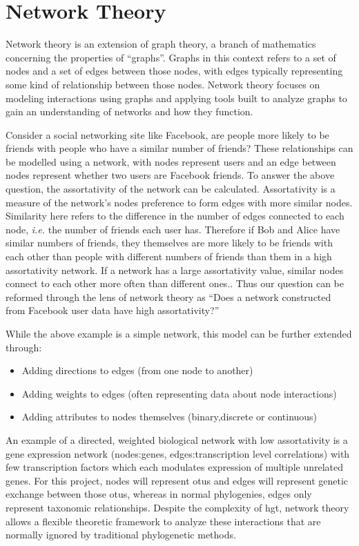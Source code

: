 \section*{Network Theory}
Network theory is an extension of graph theory, a branch of mathematics concerning the properties of ``graphs''.
Graphs in this context refers to a set of nodes and a set of edges between those nodes, with edges typically representing some kind of relationship between those nodes\citep{netgen}.
Network theory focuses on modeling interactions using graphs and applying tools built to analyze graphs to gain an understanding of networks and how they function.\par
Consider a social networking site like Facebook, are people more likely to be friends with people who have a similar number of friends?
These relationships can be modelled using a network, with nodes represent users and an edge between nodes represent whether two users are Facebook friends.
To answer the above question, the assortativity of the network can be calculated.
Assortativity is a measure of the network's nodes preference to form edges with more similar nodes\citep{netgen}.
Similarity here refers to the difference in the number of edges connected to each node, \textit{i.e.} the number of friends each user has.
Therefore if Bob and Alice have similar numbers of friends, they themselves are more likely to be friends with each other than people with different numbers of friends than them in a high assortativity network.
If a network has a large assortativity value, similar nodes connect to each other more often than different ones.\citep{netgen}.
Thus our question can be reformed through the lens of network theory as ``Does a network constructed from Facebook user data have high assortativity?''
\begin{center}
\end{center}
While the above example is a simple network, this model can be further extended through:
\begin{itemize}
    \item Adding directions to edges (from one node to another)
    \item Adding weights to edges (often representing data about node interactions)
    \item Adding attributes to nodes themselves (binary,discrete or continuous)
\end{itemize}
An example of a directed, weighted biological network with low assortativity is a gene expression network (nodes:genes, edges:transcription level correlations) with few transcription factors which each modulates expression of multiple unrelated genes.
For this project, nodes will represent \ac{otu}s and edges will represent genetic exchange between those \ac{otu}s, whereas in normal phylogenies, edges only represent taxonomic relationships.
Despite the complexity of \ac{hgt}, network theory allows a flexible theoretic framework to analyze these interactions that are normally ignored by traditional phylogenetic methods.

